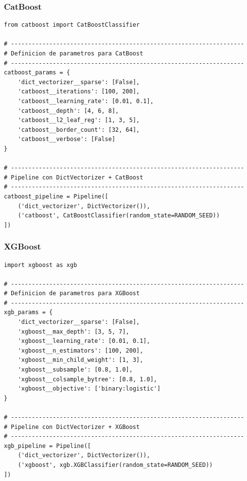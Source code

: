 \documentclass[11pt,a4paper,spanish]{book}
\numberwithin{equation}{chapter}
\numberwithin{figure}{chapter}
\begin{document}
\subsubsection{CatBoost}


\begin{lstlisting}
from catboost import CatBoostClassifier

# -------------------------------------------------------------------
# Definicion de parametros para CatBoost
# -------------------------------------------------------------------
catboost_params = {
    'dict_vectorizer__sparse': [False],
    'catboost__iterations': [100, 200],
    'catboost__learning_rate': [0.01, 0.1],
    'catboost__depth': [4, 6, 8],
    'catboost__l2_leaf_reg': [1, 3, 5],
    'catboost__border_count': [32, 64],
    'catboost__verbose': [False]
}

# -------------------------------------------------------------------
# Pipeline con DictVectorizer + CatBoost
# -------------------------------------------------------------------
catboost_pipeline = Pipeline([
    ('dict_vectorizer', DictVectorizer()),
    ('catboost', CatBoostClassifier(random_state=RANDOM_SEED))
])
\end{lstlisting}


\subsubsection{XGBoost}


\begin{lstlisting}
import xgboost as xgb

# -------------------------------------------------------------------
# Definicion de parametros para XGBoost
# -------------------------------------------------------------------
xgb_params = {
    'dict_vectorizer__sparse': [False],
    'xgboost__max_depth': [3, 5, 7],
    'xgboost__learning_rate': [0.01, 0.1],
    'xgboost__n_estimators': [100, 200],
    'xgboost__min_child_weight': [1, 3],
    'xgboost__subsample': [0.8, 1.0],
    'xgboost__colsample_bytree': [0.8, 1.0],
    'xgboost__objective': ['binary:logistic']
}

# -------------------------------------------------------------------
# Pipeline con DictVectorizer + XGBoost
# -------------------------------------------------------------------
xgb_pipeline = Pipeline([
    ('dict_vectorizer', DictVectorizer()),
    ('xgboost', xgb.XGBClassifier(random_state=RANDOM_SEED))
])
\end{lstlisting}
\end{document}
